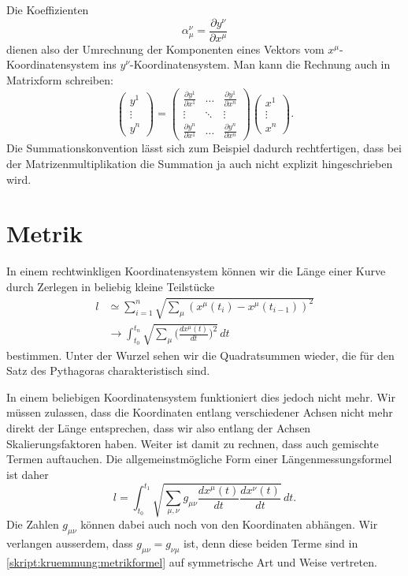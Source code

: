 Die Koeffizienten 
\[
\alpha_\mu^\nu=\frac{\partial y^{\nu}}{\partial x^{\mu}}
\]
dienen also der Umrechnung der Komponenten eines Vektors vom
$x^{\mu}$-Koordinatensystem ins $y^{\nu}$-Koordinatensystem.
Man kann die Rechnung auch in Matrixform schreiben:
\[
\begin{pmatrix}y^1\\\vdots\\y^n\end{pmatrix}
=
\begin{pmatrix}
\frac{\partial y^1}{\partial x^1}&\dots&\frac{\partial y^1}{\partial x^n}\\
\vdots&\ddots&\vdots\\
\frac{\partial y^n}{\partial x^1}&\dots&\frac{\partial y^n}{\partial x^n}
\end{pmatrix}
\begin{pmatrix}x^1\\\vdots\\x^n\end{pmatrix}.
\]
Die Summationskonvention lässt sich zum Beispiel dadurch rechtfertigen,
dass bei der Matrizenmultiplikation die Summation ja auch nicht
explizit hingeschrieben wird.

\section{Metrik}
In einem rechtwinkligen Koordinatensystem können wir die Länge
einer Kurve durch Zerlegen in beliebig kleine Teilstücke 
\begin{align*}
l
&\simeq
\sum_{i=1}^n \sqrt{\sum_{\mu} (x^{\mu}(t_i)-x^{\mu}(t_{i-1}))^2}
\\
&\rightarrow
\int_{t_0}^{t_n} \sqrt{\sum_{\mu}\biggl(\frac{dx^{\mu}(t)}{dt}\biggr)^2}\,dt
\end{align*}
bestimmen.
Unter der Wurzel sehen wir die Quadratsummen wieder, die für den
Satz des Pythagoras charakteristisch sind.

In einem beliebigen Koordinatensystem funktioniert dies jedoch nicht
mehr.
Wir müssen zulassen, dass die Koordinaten entlang verschiedener
Achsen nicht mehr direkt der Länge entsprechen, dass wir also
entlang der Achsen Skalierungsfaktoren haben.
Weiter ist damit zu rechnen, dass auch gemischte Termen auftauchen.
Die allgemeinstmögliche Form einer Längenmessungsformel ist daher
\begin{equation}
l
=
\int_{t_0}^{t_1}
\sqrt{\sum_{\mu,\nu} g_{\mu\nu} \frac{dx^{\mu}(t)}{dt}\frac{dx^{\nu}(t)}{dt}}\,dt.
\label{skript:kruemmung:metrikformel}
\end{equation}
Die Zahlen $g_{\mu\nu}$ können dabei auch noch von den Koordinaten
abhängen.
Wir verlangen ausserdem, dass $g_{\mu\nu}=g_{\nu\mu}$ ist, denn
diese beiden Terme sind in \eqref{skript:kruemmung:metrikformel}
auf symmetrische Art und Weise vertreten.


